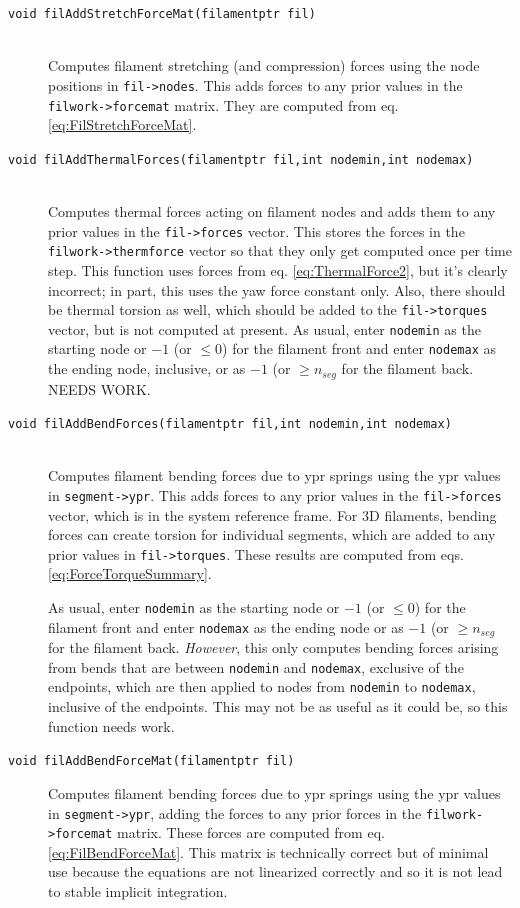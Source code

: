 \documentclass {scrbook}
\newcommand {\ttt} {\texttt}
\begin{document}
\begin{description}
\item[\ttt{void filAddStretchForceMat(filamentptr fil)}]
\hfill \\
Computes filament stretching (and compression) forces using the node positions in \ttt{fil->nodes}. This adds forces to any prior values in the \ttt{filwork->forcemat} matrix. They are computed from eq. \ref{eq:FilStretchForceMat}.

\item[\ttt{void filAddThermalForces(filamentptr fil,int nodemin,int nodemax)}]
\hfill \\
Computes thermal forces acting on filament nodes and adds them to any prior values in the \ttt{fil->forces} vector. This stores the forces in the \ttt{filwork->thermforce} vector so that they only get computed once per time step. This function uses forces from eq. \ref{eq:ThermalForce2}, but it's clearly incorrect; in part, this uses the yaw force constant only. Also, there should be thermal torsion as well, which should be added to the \ttt{fil->torques} vector, but is not computed at present. As usual, enter \ttt{nodemin} as the starting node or $-1$ (or $\leq 0$) for the filament front and enter \ttt{nodemax} as the ending node, inclusive, or as $-1$ (or $\geq n_{seg}$ for the filament back. NEEDS WORK.

\item[\ttt{void filAddBendForces(filamentptr fil,int nodemin,int nodemax)}]
\hfill \\
Computes filament bending forces due to ypr springs using the ypr values in \ttt{segment->ypr}. This adds forces to any prior values in the \ttt{fil->forces} vector, which is in the system reference frame. For 3D filaments, bending forces can create torsion for individual segments, which are added to any prior values in \ttt{fil->torques}. These results are computed from eqs. \ref{eq:ForceTorqueSummary}.

As usual, enter \ttt{nodemin} as the starting node or $-1$ (or $\leq 0$) for the filament front and enter \ttt{nodemax} as the ending node or as $-1$ (or $\geq n_{seg}$ for the filament back. \textit{However}, this only computes bending forces arising from bends that are between \ttt{nodemin} and \ttt{nodemax}, exclusive of the endpoints, which are then applied to nodes from \ttt{nodemin} to \ttt{nodemax}, inclusive of the endpoints. This may not be as useful as it could be, so this function needs work.

\item[\ttt{void filAddBendForceMat(filamentptr fil)}]
Computes filament bending forces due to ypr springs using the ypr values in \ttt{segment->ypr}, adding the forces to any prior forces in the \ttt{filwork->forcemat} matrix. These forces are computed from eq. \ref{eq:FilBendForceMat}. This matrix is technically correct but of minimal use because the equations are not linearized correctly and so it is not lead to stable implicit integration.


\end{description}
\end{document}
